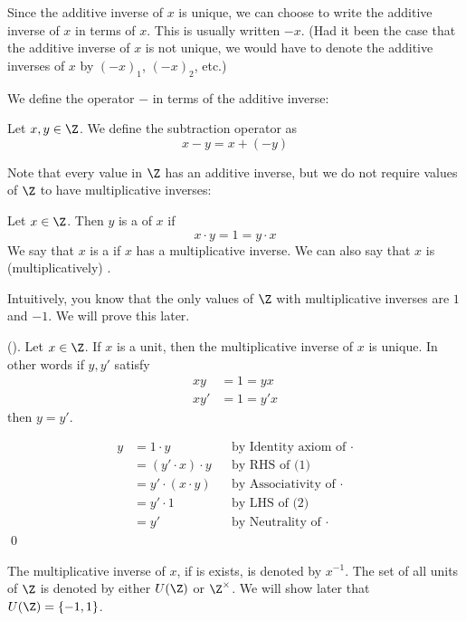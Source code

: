 Since the additive inverse of $x$ is unique, we can choose to write
the additive inverse of $x$ in terms of $x$.
This is usually written $-x$.
(Had it been the case that the additive inverse of $x$ is not unique,
we would have to denote the additive inverses of $x$ by
$(-x)_1$, $(-x)_2$, etc.)

We define the operator $-$ in terms of the additive inverse:

\begin{defn}
  Let $x,y \in \Z$. We define the subtraction operator as
  \[
  x - y = x + (-y)
  \]
\end{defn}

Note that every value in $\Z$ has an additive inverse, but we do not
require values of $\Z$ to have multiplicative inverses:

\begin{defn}
  Let $x \in \Z$. Then $y$ is a  of $x$ if
  \[
  x\cdot y = 1 = y\cdot x
  \]
  We say that $x$ is a  if $x$ has a multiplicative inverse.
  We can also say that $x$ is (multiplicatively) .
\end{defn}

Intuitively, you know that the only values of $\Z$ with multiplicative inverses
are $1$ and $-1$.
We will prove this later.

\begin{prop}
\label{prop:Z-uniqueness-of-multiplicative-inverse}
\textnormal{()}.
  Let $x \in \Z$.
  If $x$ is a unit, then the multiplicative inverse of $x$ is unique.
  In other words if $y,y'$ satisfy
  \begin{align*}
    x  y &= 1 = y x \tag{1}\\
    x  y' &= 1 = y' x \tag{2}
  \end{align*}
  then $y = y'$.
\end{prop}
\proof
\begin{align*}
y &= 1 \cdot y            & & \text{by Identity axiom of $\cdot$} \\
  &= (y' \cdot x) \cdot y & & \text{by RHS of (1)} \\
  &= y' \cdot (x \cdot y) & & \text{by Associativity of $\cdot$} \\
  &= y' \cdot 1           & & \text{by LHS of (2)} \\
  &= y'                   & & \text{by Neutrality of $\cdot$ }
\end{align*}
\qed

\begin{defn}
  The multiplicative inverse of $x$, if is exists, is denoted by $x^{-1}$.
  The set of all units of $\Z$ is denoted by either $U(\Z)$ or $\Z^\times$.
  We will show later that $U(\Z) = \{-1, 1\}$.
\end{defn}

